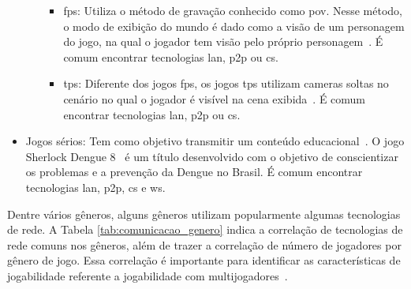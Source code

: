 \begin{itemize}
\begin{itemize}
        \begin{itemize}
          \item \ac{fps}: Utiliza o método de gravação conhecido como \ac{pov}. Nesse método, o modo de exibição do mundo é dado como a visão de um personagem do jogo, na qual o jogador tem visão pelo próprio personagem~\cite{video_game_technologies, adams_1208533}. É comum encontrar tecnologias \ac{lan}, \ac{p2p} ou \ac{cs}.
          \item \ac{tps}: Diferente dos jogos \ac{fps}, os jogos \ac{tps} utilizam cameras soltas no cenário no qual o jogador é visível na cena exibida~\cite{video_game_technologies, adams_1208533}. É comum encontrar tecnologias \ac{lan}, \ac{p2p} ou \ac{cs}.
        \end{itemize}
    \end{itemize}
  \item Jogos sérios: Tem como objetivo transmitir um conteúdo educacional~\cite{video_game_technologies}. O jogo Sherlock Dengue 8~\cite{sherlock_dengue} é um título desenvolvido com o objetivo de conscientizar os problemas e a prevenção da Dengue no Brasil. É comum encontrar tecnologias \ac{lan}, \ac{p2p}, \ac{cs} e \ac{ws}.
\end{itemize}



Dentre vários gêneros, alguns gêneros utilizam popularmente algumas tecnologias de rede.
%
A Tabela \ref{tab:comunicacao_genero} indica a correlação de tecnologias de rede comuns nos gêneros, além de trazer a correlação de número de jogadores por gênero de jogo.
%
Essa correlação é importante para identificar as características de jogabilidade referente a jogabilidade com multijogadores~\cite{video_game_technologies}.


